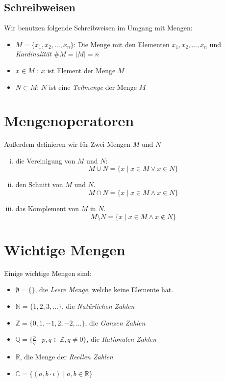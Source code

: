 \documentclass{scrreprt}
\newcommand{\NN}{\mathbb{N}}
\newcommand{\ZZ}{\mathbb{Z}}
\newcommand{\QQ}{\mathbb{Q}}
\newcommand{\RR}{\mathbb{R}}
\newcommand{\CC}{\mathbb{C}}
\begin{document}
    \subsection{Schreibweisen}
    Wir benutzen folgende Schreibweisen im Umgang mit Mengen:
    \begin{itemize}
        \item
            $M = \lbrace x_1, x_2, \dots , x_n\rbrace$: Die Menge mit den Elementen $x_1, x_2, \dots, x_n$ und \emph{Kardinalität} $\# M = |M| = n$
        \item
            $x \in M$ : $x$ ist Element der Menge $M$
        \item
            $N \subset M$: $N$ ist eine \emph{Teilmenge} der Menge $M$
    \end{itemize}

    \section{Mengenoperatoren}
    Außerdem definieren wir für Zwei Mengen $M$ und $N$
    \begin{enumerate}[i)]
        \item
            die Vereinigung von $M$ und $N$:\\
            \[
                M \cup N = \lbrace x \mid x \in M \lor x \in N \rbrace
            \]
        \item
            den Schnitt von $M$ und $N$.
            \[
                M \cap N = \lbrace x \mid x \in M \land x \in N \rbrace
            \]
        \item
            das Komplement von $M$ in $N$.
            \[
                M \setminus N = \lbrace x \mid x \in M \land x \notin N \rbrace
            \]
    \end{enumerate}

    \section{Wichtige Mengen}
        Einige wichtige Mengen sind:
        \begin{itemize}
            \item
                $\emptyset = \lbrace \rbrace$, die \emph{Leere Menge}, welche keine Elemente hat.
            \item
                $\NN = \lbrace 1, 2, 3, \dots \rbrace$, die \emph{Natürlichen Zahlen}
            \item
                $\ZZ = \lbrace 0, 1, -1, 2, -2, \dots \rbrace$, die \emph{Ganzen Zahlen}
            \item
                $\QQ = \lbrace \frac{p}{q} \mid p,q \in \ZZ, q \neq 0\rbrace$, die \emph{Rationalen Zahlen}
            \item
                $\RR$, die Menge der \emph{Reellen Zahlen}
            \item
                $\CC = \lbrace (a, b \cdot i) \mid a, b \in \RR \rbrace$
         \end{itemize}
\end{document}
